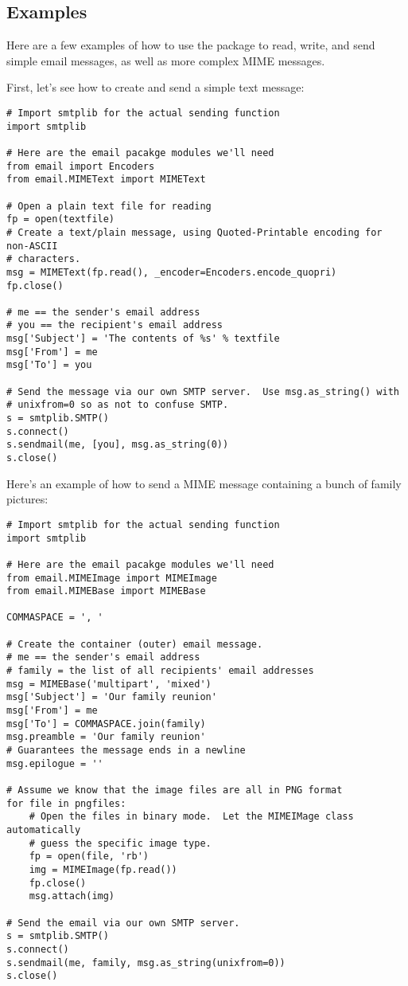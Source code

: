 \subsection{Examples}

Here are a few examples of how to use the  package to
read, write, and send simple email messages, as well as more complex
MIME messages.

First, let's see how to create and send a simple text message:

\begin{verbatim}
# Import smtplib for the actual sending function
import smtplib

# Here are the email pacakge modules we'll need
from email import Encoders
from email.MIMEText import MIMEText

# Open a plain text file for reading
fp = open(textfile)
# Create a text/plain message, using Quoted-Printable encoding for non-ASCII
# characters.
msg = MIMEText(fp.read(), _encoder=Encoders.encode_quopri)
fp.close()

# me == the sender's email address
# you == the recipient's email address
msg['Subject'] = 'The contents of %s' % textfile
msg['From'] = me
msg['To'] = you

# Send the message via our own SMTP server.  Use msg.as_string() with
# unixfrom=0 so as not to confuse SMTP.
s = smtplib.SMTP()
s.connect()
s.sendmail(me, [you], msg.as_string(0))
s.close()
\end{verbatim}

Here's an example of how to send a MIME message containing a bunch of
family pictures:

\begin{verbatim}
# Import smtplib for the actual sending function
import smtplib

# Here are the email pacakge modules we'll need
from email.MIMEImage import MIMEImage
from email.MIMEBase import MIMEBase

COMMASPACE = ', '

# Create the container (outer) email message.
# me == the sender's email address
# family = the list of all recipients' email addresses
msg = MIMEBase('multipart', 'mixed')
msg['Subject'] = 'Our family reunion'
msg['From'] = me
msg['To'] = COMMASPACE.join(family)
msg.preamble = 'Our family reunion'
# Guarantees the message ends in a newline
msg.epilogue = ''

# Assume we know that the image files are all in PNG format
for file in pngfiles:
    # Open the files in binary mode.  Let the MIMEIMage class automatically
    # guess the specific image type.
    fp = open(file, 'rb')
    img = MIMEImage(fp.read())
    fp.close()
    msg.attach(img)

# Send the email via our own SMTP server.
s = smtplib.SMTP()
s.connect()
s.sendmail(me, family, msg.as_string(unixfrom=0))
s.close()
\end{verbatim}

